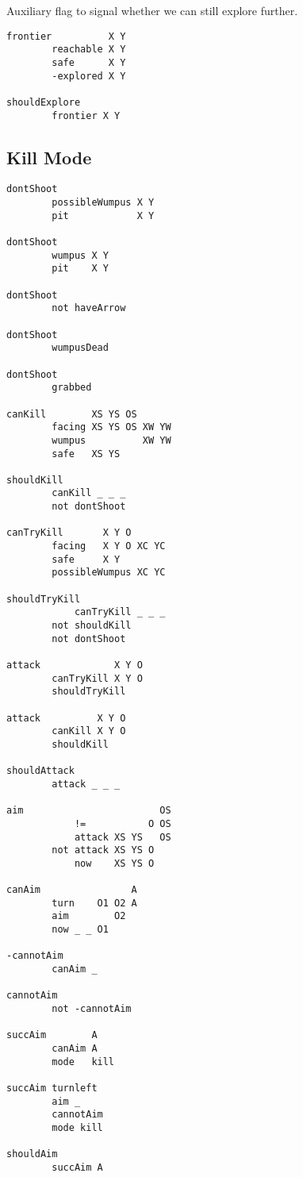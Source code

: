 Auxiliary flag to signal whether we can still explore further.

\begin{verbatim}
frontier          X Y
        reachable X Y
        safe      X Y
        -explored X Y

shouldExplore
        frontier X Y
\end{verbatim}

\hypertarget{kill-mode}{%
\subsection{Kill Mode}\label{kill-mode}}

\begin{verbatim}
dontShoot
        possibleWumpus X Y
        pit            X Y

dontShoot
        wumpus X Y
        pit    X Y

dontShoot
        not haveArrow

dontShoot
        wumpusDead

dontShoot
        grabbed

canKill        XS YS OS
        facing XS YS OS XW YW
        wumpus          XW YW
        safe   XS YS

shouldKill
        canKill _ _ _
        not dontShoot

canTryKill       X Y O
        facing   X Y O XC YC
        safe     X Y
        possibleWumpus XC YC

shouldTryKill
            canTryKill _ _ _
        not shouldKill
        not dontShoot

attack             X Y O
        canTryKill X Y O
        shouldTryKill

attack          X Y O
        canKill X Y O
        shouldKill

shouldAttack
        attack _ _ _

aim                        OS
            !=           O OS
            attack XS YS   OS
        not attack XS YS O
            now    XS YS O

canAim                A
        turn    O1 O2 A
        aim        O2
        now _ _ O1

-cannotAim
        canAim _

cannotAim
        not -cannotAim

succAim        A
        canAim A
        mode   kill

succAim turnleft
        aim _
        cannotAim
        mode kill

shouldAim
        succAim A
\end{verbatim}

